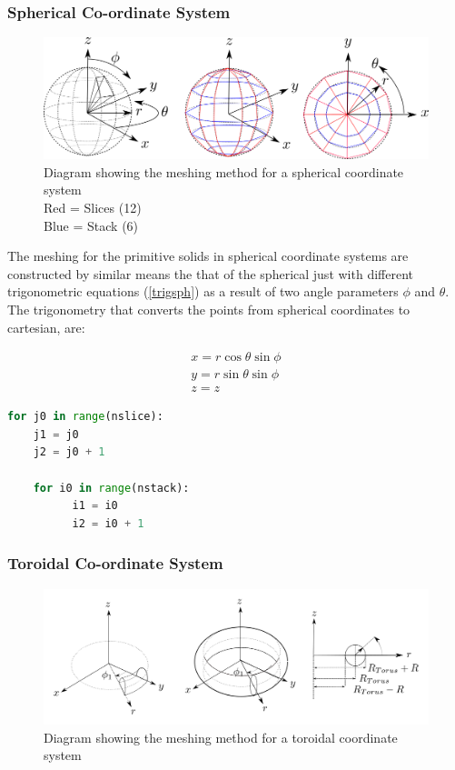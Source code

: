 \documentclass[12pt,a4paper]{article}
\begin{document}
\subsubsection{Spherical Co-ordinate System}

\begin{figure}[h!]
\centering
\includegraphics[scale=0.5]{Images//Coords//sph.png}
\caption[width=\columnwidth]{Diagram showing the meshing method for a spherical coordinate system\\
Red = Slices (12)\\
Blue = Stack (6)}
\label{sphmeshin}
\end{figure}

The meshing for the primitive solids in spherical coordinate systems are constructed by similar means the that of the spherical just with different trigonometric equations (\ref{trigsph}) as a result of two angle parameters $\phi$ and $\theta$. 
The trigonometry that converts the points from spherical coordinates to cartesian, are:

\begin{equation}
\begin{split}
x = r \cos{\theta}\sin{\phi}\\
y = r \sin{\theta}\sin{\phi} \\
z = z
\end{split}
\label{trigsph}
\end{equation}

\begin{lstlisting}[language=Python, caption=Python example]
for j0 in range(nslice):
    j1 = j0
    j2 = j0 + 1

    for i0 in range(nstack):
          i1 = i0
          i2 = i0 + 1
\end{lstlisting}



\subsubsection{Toroidal Co-ordinate System}
\begin{figure}[h!]
\centering
\includegraphics[scale=0.35]{Images//Coords/torus_coords.png}
\caption[width=\columnwidth]{Diagram showing the meshing method for a toroidal coordinate system}
\label{conts}
\end{figure}
\end{document}
